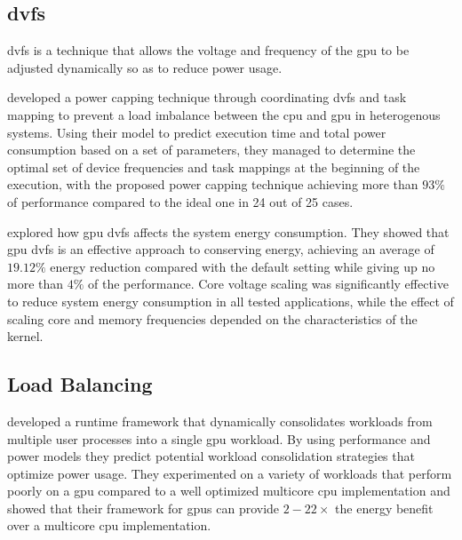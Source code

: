		\subsection{\acrlong{dvfs}}
			\gls{dvfs} is a technique that allows the voltage and frequency of the \gls{gpu} to be adjusted dynamically so as to reduce power usage.

			\textcite{Komoda2013} developed a power capping technique through coordinating \gls{dvfs} and task mapping to prevent a load imbalance between the \gls{cpu} and \gls{gpu} in heterogenous systems.
			Using their model to predict execution time and total power consumption based on a set of parameters, they managed to determine the optimal set of device frequencies and task mappings at the beginning of the execution, with the proposed power capping technique achieving more than $93 \%$ of performance compared to the ideal one in 24 out of 25 cases.

			\textcite{Mei2013} explored how \gls{gpu} \gls{dvfs} affects the system energy consumption.
			They showed that \gls{gpu} \gls{dvfs} is an effective approach to conserving energy, achieving an average of $19.12 \%$ energy reduction compared with the default setting while giving up no more than $4 \%$ of the performance.
			Core voltage scaling was significantly effective to reduce system energy consumption in all tested applications, while the effect of scaling core and memory frequencies depended on the characteristics of the kernel.

		\subsection{Load Balancing}
			\textcite{Li2011} developed a runtime framework that dynamically consolidates workloads from multiple user processes into a single \gls{gpu} workload.
			By using performance and power models they predict potential workload consolidation strategies that optimize power usage.
			They experimented on a variety of workloads that perform poorly on a \gls{gpu} compared to a well optimized multicore \gls{cpu} implementation and showed that their framework for \glspl{gpu} can provide $2-22 \times$ the energy benefit over a multicore \gls{cpu} implementation.